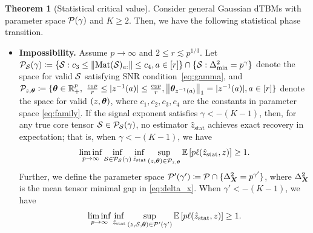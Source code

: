 \documentclass[journal]{IEEEtran}
\theoremstyle{definition}
\newtheorem{thm}{Theorem}
\theoremstyle{definition}
\begin{document}
\begin{thm}[Statistical critical value]\label{thm:stats} Consider general Gaussian dTBMs with parameter space $\mathcal{P}(\gamma)$ and $K\geq 2$. Then, we have the following statistical phase transition. 

\begin{itemize}[wide]
    \item 
    \textbf{Impossibility.}  {Assume $p \rightarrow \infty$ and $2 \leq r\lesssim p^{1/3}$.} Let $\mathcal{P}_{\mathcal{S}}(\gamma) \coloneqq \{ \mathcal{S}: c_3\leq \lVert\text{Mat}(\mathcal{S})_{a:}\rVert\leq c_4, a\in[r]\} \cap \{ \mathcal{S}: \Delta_{\min}^2 = p^{\gamma}\}$ denote the space for valid $\mathcal{S}$ satisfying SNR condition~\eqref{eq:gamma}, and $\tP_{z ,\mtheta} \coloneqq \{ \mtheta\in\mathbb{R}^p_{+},\ 
{c_1p\over r}\leq |z^{-1}(a)|\leq {c_2 p\over r}, \onorm{\mtheta_{z^{-1}(a)}}_1=|z^{-1}(a)|, a \in [r] \}$ denote the space for valid $(z, \boldsymbol{\theta})$,  where $c_1, c_2, c_3, c_4$ are the constants in parameter space \eqref{eq:family}. If the signal exponent satisfies $\gamma < -(K-1)$, then, for any true core tensor $\mathcal{S} \in \mathcal{P}_{\mathcal{S}}(\gamma)$, no estimator $\hat z_{\text{stat}}$ achieves exact recovery in expectation; that is, when $\gamma< -(K-1)$, we have 
    \begin{equation}\label{eq:minminmax}
   \liminf_{p \rightarrow \infty}\inf_{\tS \in  \tP_{\tS}(\gamma)}  \inf_{\hat z_{\text{stat}}}\sup_{ (z, \mtheta) \in \tP_{z, \mtheta}} \bbE \left[ p\ell(\hat z_{\text{stat}}, z) \right]\geq 1.
\end{equation}
{ 
    Further, we define the parameter space $\mathcal{P}'(\gamma') \coloneqq \mathcal{P}\cap \{ \Delta_{\bm X}^2 = p^{\gamma'} \}$, where $\Delta_{\bm X}^2$ is the mean tensor minimal gap in \eqref{eq:delta_x}. When $\gamma' < -(K-1)$, we have 
    \begin{equation}
        \liminf_{p \rightarrow \infty} \inf_{\hat z_{\rm stat}} \sup_{(z, \mathcal{S}, \boldsymbol{\theta}) \in \mathcal{P}'(\gamma')}  \mathbb{E} \left[ p\ell(\hat z_{\text{stat}}, z) \right]\geq 1.
    \end{equation}
    }

    
    

\end{itemize}
\end{thm}
\end{document}
